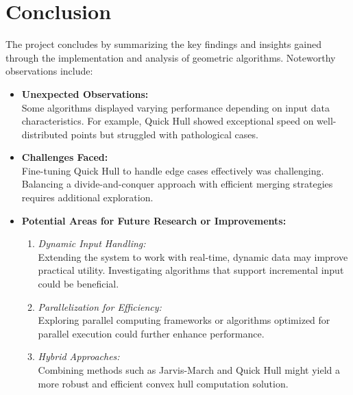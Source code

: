 \documentclass[a4paper, 10pt, twocolumn]{article}
\begin{document}
\section{Conclusion}
The project concludes by summarizing the key findings and insights gained through the implementation and analysis of geometric algorithms. 
Noteworthy observations include:
\begin{itemize}
    \item \textbf{Unexpected Observations:}\\
    Some algorithms displayed varying performance depending on input data characteristics. For example, Quick Hull showed exceptional speed on well-distributed points but struggled with pathological cases.
    \item \textbf{Challenges Faced:}\\
    Fine-tuning Quick Hull to handle edge cases effectively was challenging. Balancing a divide-and-conquer approach with efficient merging strategies requires additional exploration.
    \item \textbf{Potential Areas for Future Research or Improvements:}\\
    \begin{enumerate}
        \item \textit{Dynamic Input Handling:}\\ 
          Extending the system to work with real-time, dynamic data may improve practical utility. Investigating algorithms that support incremental input could be beneficial.
        \item \textit{Parallelization for Efficiency:}\\ 
          Exploring parallel computing frameworks or algorithms optimized for parallel execution could further enhance performance.
        \item \textit{Hybrid Approaches:}\\ 
          Combining methods such as Jarvis-March and Quick Hull might yield a more robust and efficient convex hull computation solution.
    \end{enumerate}
\end{itemize}

\end{document}
